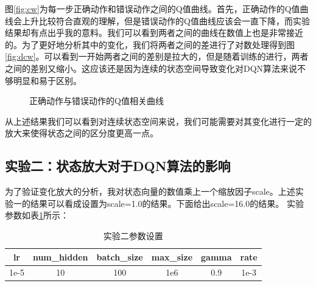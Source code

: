 \documentclass{article}
\begin{document}
        图\ref{fig:cw}为每一步正确动作和错误动作之间的Q值曲线。首先，正确动作的Q值曲线会上升比较符合直观的理解，但是错误动作的Q值曲线应该会一直下降，而实验结果却有点出乎我的意料。我们可以看到两者之间的曲线在数值上也是非常接近的。为了更好地分析其中的变化，我们将两者之间的差进行了对数处理得到图\ref{fig:dcw}。可以看到一开始两者之间的差别是拉大的，但是随着训练的进行，两者之间的差别又缩小。这应该还是因为连续的状态空间导致变化对DQN算法来说不够明显和易于区别。     
        \begin{figure}[htb]
            \centering
            \caption{正确动作与错误动作的Q值相关曲线}
        \end{figure}

        从上述结果我们可以看到对连续状态空间来说，我们可能需要对其变化进行一定的放大来使得状态之间的区分度更高一点。
        
        \subsection{实验二：状态放大对于DQN算法的影响}
        为了验证变化放大的分析，我对状态向量的数值乘上一个缩放因子scale。上述实验一的结果可以看成设置为scale=1.0的结果。下面给出scale=16.0的结果。
        实验参数如表\ref{table:parameter2}所示：
        \begin{table}[h]
            \centering
            \begin{tabular}{c|c|c|c|c|c}
                \hline
                lr & num\_hidden & batch\_size & max\_size & gamma & rate\\
                \hline
                1e-5 & 10 & 100 & 1e6 & 0.9 & 1e-3\\
                \hline
            \end{tabular}
            \caption{实验二参数设置}
            \label{table:parameter2}
        \end{table}
\end{document}
